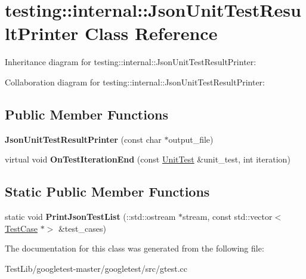 \hypertarget{classtesting_1_1internal_1_1JsonUnitTestResultPrinter}{}\section{testing\+:\+:internal\+:\+:Json\+Unit\+Test\+Result\+Printer Class Reference}
\label{classtesting_1_1internal_1_1JsonUnitTestResultPrinter}


Inheritance diagram for testing\+:\+:internal\+:\+:Json\+Unit\+Test\+Result\+Printer\+:


Collaboration diagram for testing\+:\+:internal\+:\+:Json\+Unit\+Test\+Result\+Printer\+:
\subsection*{Public Member Functions}
\begin{DoxyCompactItemize}
\item 
\mbox{\label{classtesting_1_1internal_1_1JsonUnitTestResultPrinter_a273623decde1be18db45e95594f9d501}} 
{\bfseries Json\+Unit\+Test\+Result\+Printer} (const char $\ast$output\+\_\+file)
\item 
\mbox{\label{classtesting_1_1internal_1_1JsonUnitTestResultPrinter_a44edb54cf1ab8cdcd56bda5058b8f1d6}} 
virtual void {\bfseries On\+Test\+Iteration\+End} (const \hyperlink{classtesting_1_1UnitTest}{Unit\+Test} \&unit\+\_\+test, int iteration)
\end{DoxyCompactItemize}
\subsection*{Static Public Member Functions}
\begin{DoxyCompactItemize}
\item 
\mbox{\label{classtesting_1_1internal_1_1JsonUnitTestResultPrinter_a5f2b7e7c90cbdd2029ddaa6c1ad75de0}} 
static void {\bfseries Print\+Json\+Test\+List} (\+::std\+::ostream $\ast$stream, const std\+::vector$<$ \hyperlink{classtesting_1_1TestCase}{Test\+Case} $\ast$$>$ \&test\+\_\+cases)
\end{DoxyCompactItemize}


The documentation for this class was generated from the following file\+:\begin{DoxyCompactItemize}
\item 
Test\+Lib/googletest-\/master/googletest/src/gtest.\+cc\end{DoxyCompactItemize}
